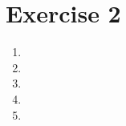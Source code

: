 \documentclass[leqno]{article}
\begin{document}
\section*{Exercise 2}

\begin{enumerate}
	\item 
	\item 
	\item 
	\item 
	\item 
\end{enumerate}
\end{document}
